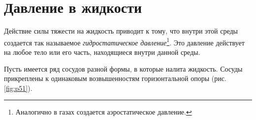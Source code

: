\documentclass[main.tex]{subfiles}
\begin{document}

 

 

\setcounter{section}{28
}
\addtocounter{section}{-1} 

\section{Давление в жидкости}

Действие силы тяжести на жидкость приводит к тому, что внутри этой среды создается так называемое \emph{гидростатическое давление}\footnote{Аналогично в газах создается аэростатическое давление.}. Это давление действует на любое тело или его часть, находящиеся внутри данной среды.

Пусть имеется ряд сосудов разной формы, в которые налита жидкость. Сосуды прикреплены к одинаковым возвышенностям горизонтальной опоры (рис.\,\ref{fig:p51}).
\end{document}
